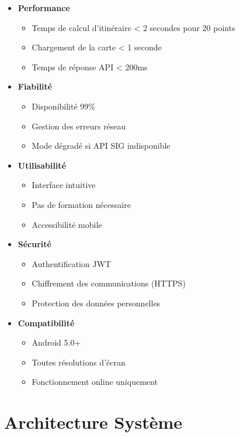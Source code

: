 \documentclass[12pt,a4paper]{report}
\begin{document}
\begin{itemize}
    \item \textbf{Performance}
    \begin{itemize}
        \item Temps de calcul d'itinéraire < 2 secondes pour 20 points
        \item Chargement de la carte < 1 seconde
        \item Temps de réponse API < 200ms
    \end{itemize}

    \item \textbf{Fiabilité}
    \begin{itemize}
        \item Disponibilité 99\%
        \item Gestion des erreurs réseau
        \item Mode dégradé si API SIG indisponible
    \end{itemize}

    \item \textbf{Utilisabilité}
    \begin{itemize}
        \item Interface intuitive
        \item Pas de formation nécessaire
        \item Accessibilité mobile
    \end{itemize}

    \item \textbf{Sécurité}
    \begin{itemize}
        \item Authentification JWT
        \item Chiffrement des communications (HTTPS)
        \item Protection des données personnelles
    \end{itemize}

    \item \textbf{Compatibilité}
    \begin{itemize}
        \item Android 5.0+
        \item Toutes résolutions d'écran
        \item Fonctionnement online uniquement
    \end{itemize}
\end{itemize}

\section{Architecture Système}
\end{document}
